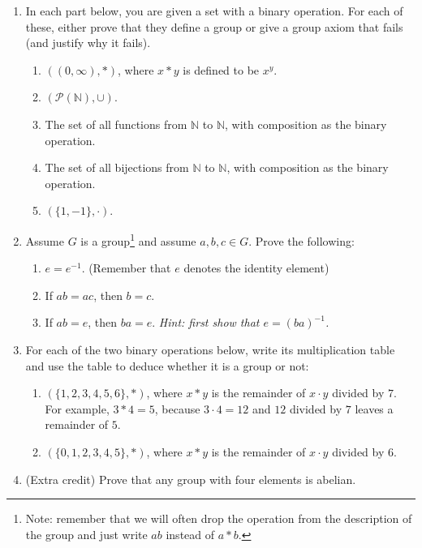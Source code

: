 \documentclass{amsart}
\theoremstyle{definition}
\begin{document}
\begin{enumerate}
\item In each part below, you are given a set with a binary operation. For each of these, either prove that they define a group or give a group axiom that fails (and justify why it fails).

  \begin{enumerate}
  \item $((0, \infty), \ast)$, where $x \ast y$ is defined to be $x^y$.
  \item $(\mathcal{P} (\mathbb{N}), \cup)$.
  \item The set of all functions from $\mathbb{N}$ to $\mathbb{N}$, with composition as the binary operation.
  \item The set of all bijections from $\mathbb{N}$ to $\mathbb{N}$, with composition as the binary operation.
  \item $(\{1, -1\}, \cdot)$.
  \end{enumerate}

\item Assume $G$ is a group\footnote{Note: remember that we will often drop the operation from the description of the group and just write $ab$ instead of $a \ast b$.} and assume $a, b, c \in G$. Prove the following:
  \begin{enumerate}
  \item $e = e^{-1}$. (Remember that $e$ denotes the identity element)
  \item If $a b = a c$, then $b = c$.
  \item If $ab = e$, then $ba = e$. \emph{Hint: first show that $e = (ba)^{-1}$.}
  \end{enumerate}
\item For each of the two binary operations below, write its multiplication table and use the table to deduce whether it is a group or not:

  \begin{enumerate}
  \item $(\{1, 2, 3, 4, 5, 6\}, \ast)$, where $x \ast y$ is the remainder of $x \cdot y$ divided by $7$. For example, $3 \ast 4 = 5$, because $3 \cdot 4 = 12$ and $12$ divided by $7$ leaves a remainder of $5$.
  \item $(\{0, 1, 2, 3, 4, 5\}, \ast)$, where $x \ast y$ is the remainder of $x \cdot y$ divided by $6$.
  \end{enumerate}
\item (Extra credit) Prove that any group with four elements is abelian.
  
\end{enumerate}




\end{document}
